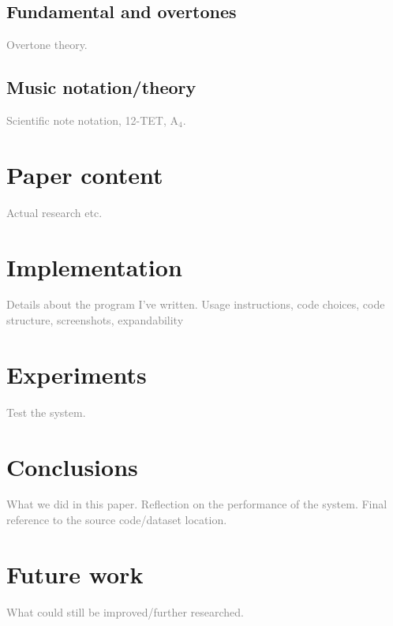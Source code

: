 \documentclass[10pt,twocolumn]{article}
\newcommand{\note}[2]{#1${}_#2$}
\begin{document}
\subsection{Fundamental and overtones}
\textcolor{gray}{Overtone theory.}

\subsection{Music notation/theory}
\textcolor{gray}{Scientific note notation, 12-TET, \note{A}{4}.}


\section{Paper content}
\textcolor{gray}{Actual research etc.}


\section{Implementation}
\textcolor{gray}{Details about the program I've written. Usage instructions, code choices, code structure, screenshots, expandability}


\section{Experiments}  \label{sec:exp}
\textcolor{gray}{Test the system.}


\section{Conclusions}
\textcolor{gray}{What we did in this paper. Reflection on the performance of the system. Final reference to the source code/dataset location.}


\section{Future work}  \label{sec:future}
\textcolor{gray}{What could still be improved/further researched.}





\end{document}

